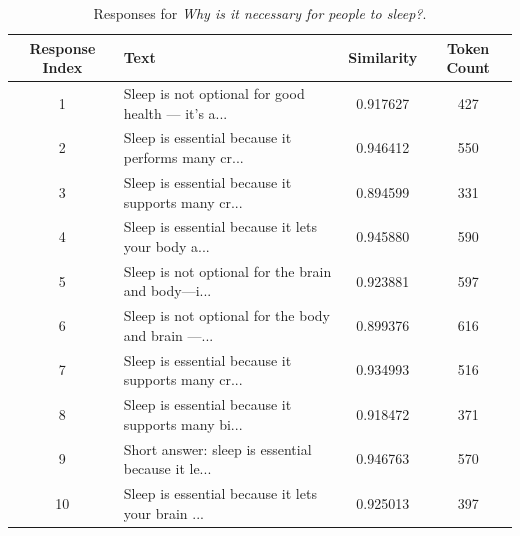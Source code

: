 \documentclass{article}
\begin{document}
\begin{table}[H]
    \centering
    \caption{Responses for \textit{Why is it necessary for people to sleep?}.}
    \label{tab:sleep_variants}
    \begin{tabular}{c >{\raggedright\arraybackslash}p{8cm} S[table-format=1.6] c}
        \toprule
        Response Index & Text & Similarity & Token Count\\
         & Sleep is not optional for good health — it’s a... & 0.917627 & 427\\
        2 & Sleep is essential because it performs many cr... & 0.946412 & 550\\
        3 & Sleep is essential because it supports many cr... & 0.894599 & 331\\
        4 & Sleep is essential because it lets your body a... & 0.945880 & 590\\
        5 & Sleep is not optional for the brain and body—i... & 0.923881 & 597\\
        6 & Sleep is not optional for the body and brain —... & 0.899376 & 616\\
        7 & Sleep is essential because it supports many cr... & 0.934993 & 516\\
        8 & Sleep is essential because it supports many bi... & 0.918472 & 371\\
        9 & Short answer: sleep is essential because it le... & 0.946763 & 570\\
        10 & Sleep is essential because it lets your brain ... & 0.925013 & 397\\
        \bottomrule
    \end{tabular}
\end{table}
\end{document}
